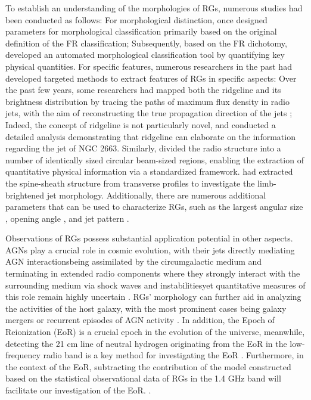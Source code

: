 \documentclass{aa}
\begin{document}
To establish an understanding of the morphologies of RGs, numerous studies had been conducted as follows: For morphological distinction, \cite{lin_populations_2010} once designed parameters for morphological classification primarily based on the original definition of the FR classification; Subsequently, based on the FR dichotomy, \cite{mingo_revisiting_2019} developed an automated morphological classification tool by quantifying key physical quantities. For specific features, numerous researchers in the past had developed targeted methods to extract features of RGs in specific aspects: Over the past few years, some researchers had mapped both the ridgeline and its brightness distribution by tracing the paths of maximum flux density in radio jets, with the aim of reconstructing the true propagation direction of the jets \citep[e.g.,][]{barkus_application_2021,clews_radio-loud_2025}; Indeed, the concept of ridgeline is not particularly novel, and \cite{velovic_collimation_2022} conducted a detailed analysis demonstrating that ridgeline can elaborate on the information regarding the jet of NGC 2663. Similarly, \cite{bushi_head-tail_2025} divided the radio structure into a number of identically sized circular beam-sized regions, enabling the extraction of quantitative physical information via a standardized framework. \cite{park_discovery_2024,foschi_evolution_2025} had extracted the spine-sheath structure from transverse profiles to investigate the limb-brightened jet morphology. Additionally, there are numerous additional parameters that can be used to characterize RGs, such as the largest angular size \citep[e.g.,][]{vardoulaki_fr-type_2021}, opening angle \citep[e.g.,][]{lao_identification_2025}, and jet pattern \citep[e.g.,][]{ andreasyan_study_2013,javaherian_morphological-based_2023,xie_recognizing_2024}.

Observations of RGs possess substantial application potential in other aspects. AGNs play a crucial role in cosmic evolution, with their jets directly mediating AGN interactions\textemdash being assimilated by the circumgalactic medium and terminating in extended radio components where they strongly interact with the surrounding medium via shock waves and instabilities\textemdash yet quantitative measures of this role remain highly uncertain \citep{begelman_theory_1984,blandford_relativistic_2019}. RGs' morphology can further aid in analyzing the activities of the host galaxy, with the most prominent cases being galaxy mergers \citep[e.g.,][]{merritt_tracing_2002,liu_x-shaped_2004,hardcastle_ngc_2019} or recurrent episodes of AGN activity \citep[e.g.,][]{lara_restarting_1999,saikia_recurrent_2009,kuzmicz_optical_2017}. In addition, the Epoch of Reionization (EoR) is a crucial epoch in the evolution of the universe, meanwhile, detecting the 21 cm line of neutral hydrogen originating from the EoR in the low-frequency radio band is a key method for investigating the EoR \citep{madau_21_1997,tozzi_radio_2000,furlanetto_cosmology_2006}.  Furthermore, in the context of the EoR, subtracting the contribution of the model constructed based on the statistical observational data of RGs in the 1.4 GHz band will facilitate our investigation of the EoR. \citep{di_matteo_radio_2002,di_matteo_21-cm_2004}. 
\end{document}
